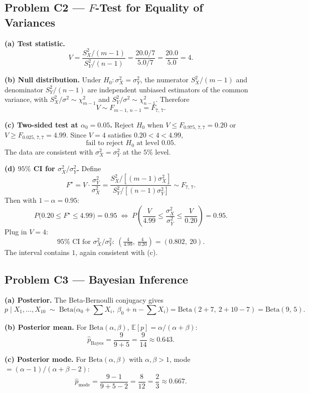 \documentclass[11pt]{article}
\begin{document}
\subsection*{Problem C2 --- $F$-Test for Equality of Variances}

\textbf{(a) Test statistic.}
\[
V = \frac{S_X^2/(m-1)}{S_Y^2/(n-1)} = \frac{20.0/7}{5.0/7} = \frac{20.0}{5.0} = \boxed{4.}
\]

\textbf{(b) Null distribution.} Under $H_0: \sigma_X^2 = \sigma_Y^2$, the numerator $S_X^2/(m-1)$ and denominator $S_Y^2/(n-1)$ are independent unbiased estimators of the common variance, with $S_X^2/\sigma^2 \sim \chi^2_{m-1}$ and $S_Y^2/\sigma^2 \sim \chi^2_{n-1}$. Therefore
\[
\boxed{V \sim F_{m-1,\, n-1} = F_{7,\,7}.}
\]

\textbf{(c) Two-sided test at $\alpha_0 = 0.05$.} Reject $H_0$ when $V \le F_{0.975,\,7,7} = 0.20$ or $V \ge F_{0.025,\,7,7} = 4.99$. Since $V = 4$ satisfies $0.20 < 4 < 4.99$,
\[
\boxed{\text{fail to reject } H_0\text{ at level } 0.05.}
\]
The data are consistent with $\sigma_X^2 = \sigma_Y^2$ at the $5\%$ level.

\textbf{(d) $95\%$ CI for $\sigma_X^2/\sigma_Y^2$.} Define
\[
F^\star = V \cdot \frac{\sigma_Y^2}{\sigma_X^2} = \frac{S_X^2/[(m-1)\sigma_X^2]}{S_Y^2/[(n-1)\sigma_Y^2]} \sim F_{7,\,7}.
\]
Then with $1 - \alpha = 0.95$:
\[
P\!\bigl(0.20 \le F^\star \le 4.99\bigr) = 0.95
\;\Longleftrightarrow\;
P\!\left(\frac{V}{4.99} \le \frac{\sigma_X^2}{\sigma_Y^2} \le \frac{V}{0.20}\right) = 0.95.
\]
Plug in $V = 4$:
\[
\boxed{95\%\text{ CI for } \sigma_X^2/\sigma_Y^2:\ \left(\tfrac{4}{4.99},\ \tfrac{4}{0.20}\right) = (0.802,\ 20).}
\]
The interval contains $1$, again consistent with (c).

\subsection*{Problem C3 --- Bayesian Inference}

\textbf{(a) Posterior.} The Beta-Bernoulli conjugacy gives
\[
p \mid X_1,\dots,X_{10} \;\sim\; \text{Beta}\bigl(\alpha_0 + \textstyle\sum X_i,\ \beta_0 + n - \sum X_i\bigr)
= \text{Beta}(2 + 7,\ 2 + 10 - 7) = \boxed{\text{Beta}(9,\,5).}
\]

\textbf{(b) Posterior mean.} For $\text{Beta}(\alpha,\beta)$, $\mathbb{E}[p] = \alpha/(\alpha+\beta)$:
\[
\widehat{p}_{\text{Bayes}} = \frac{9}{9 + 5} = \frac{9}{14} \approx \boxed{0.643.}
\]

\textbf{(c) Posterior mode.} For $\text{Beta}(\alpha,\beta)$ with $\alpha,\beta>1$, mode $= (\alpha-1)/(\alpha+\beta-2)$:
\[
\widehat{p}_{\text{mode}} = \frac{9 - 1}{9 + 5 - 2} = \frac{8}{12} = \frac{2}{3} \approx \boxed{0.667.}
\]
\end{document}
